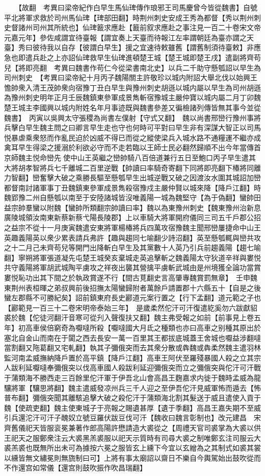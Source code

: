 　　【故翻　考異曰梁帝紀作白早生馬仙琕傳作琅邪王司馬慶曾今皆從魏書】自號平北將軍求救於司州馬仙琕【琕部田翻】時荆州刺史安成王秀為都督【秀以荆州刺史督諸州司州其所統也】仙琕籖求應赴【籖前叙求應赴之事注見一百二十卷宋文帝元嘉元年】參佐咸謂宜待臺報【謂宜奏上天臺而待報江左率謂朝廷為臺亦謂之天臺】秀曰彼待我以自存【彼謂白早生】援之宜速待敕雖舊【謂舊制須待臺敕】非應急也即遣兵赴之上亦詔仙琕救早生仙琕進頓楚王城【楚王城即楚王戌】遣副將齊苟兒【將即亮翻　考異曰魏書作苟仁今從梁書南北史】以兵二千助守懸瓠詔以早生為司州刺史　【考異曰梁帝紀十月丙子魏陽關主許敬珍以城内附詔大舉北伐以始興王憺帥衆入清王茂帥衆向宿豫丁丑白早生與豫州刺史胡遜以城内屬以早生為司州胡遜為豫州刺史明年正月壬辰魏鎮東參軍成景雋斬宿豫城主嚴仲寶以城内屬二月丁卯魏楚王城主李國興以城内附姓名年月事迹既與魏書參差又徧檢諸列傳皆無其事今並從魏書】　丙寅以吳興太守張稷為尚書左僕射【守式又翻】　魏以尚書邢巒行豫州事將兵擊白早生魏主問之曰卿言早生走也守也何時可平對曰早生非有深謀大智正以司馬悦暴虐乘衆怒而作亂民迫於凶威不得已而從之縱使梁兵入城水路不通糧運不繼亦成禽耳早生得梁之援溺於利欲必守而不走若臨以王師士民必翻然歸順不出今年當傳首京師魏主悦命巒先使中山王英繼之巒帥騎八百倍道兼行五日至鮑口丙子早生遣其大將胡孝智將兵七千離城二百里逆戰【帥讀曰率騎奇寄翻下同將即亮翻下椿將同離力智翻】巒奮擊大破之乘勝長驅至懸瓠早生出城逆戰又破之因渡汝水圍其城詔加巒都督南討諸軍事丁丑魏鎮東參軍成景雋殺宿豫戍主嚴仲賢以城來降【降戶江翻】時魏郢豫二州自懸瓠以南至于安陸諸城皆沒唯義陽一城為魏堅守【為于偽翻】蠻帥田益宗帥羣蠻以附魏【蠻帥所類翻宗帥讀曰率】魏以為東豫州刺史【魏東豫州治新息廣陵城領汝南東新蔡新蔡弋陽長陵郡】上以車騎大將軍開府儀同三司五千戶郡公招之益宗不從十一月庚寅魏遣安東將軍楊椿將兵四萬攻宿豫魏主聞邢巒屢捷命中山王英趣義陽英以衆少累表請兵弗許【趣與趨同七喻翻少詩沼翻】英至懸瓠輒與巒共攻之十二月己未齊苟兒等開門出降斬白早生及其黨數十人英乃引兵前趨義陽【趨七喻翻】寧朔將軍張道凝先屯楚王城癸亥棄城走英追擊斬之魏義陽太守狄道辛祥與婁悦共守義陽將軍胡武城陶平虜攻之祥夜出襲其營擒平虜斬武城由是州境獲全論功當賞婁悦恥功出其下間之於執政賞遂不行【間古莧翻史言高肇專魏賞罰無章】　壬申魏東荆州表桓暉之弟叔興前後招撫太陽蠻歸附者萬餘戶請置郡十六縣五十【自是之後蠻左郡縣不可勝紀矣】詔前鎮東府長史酈道元案行置之【行下孟翻】道元範之子也【酈範見一百三十二卷宋明帝泰始三年】　是歲柔然佗汗可汗復遣紇奚勿六跋獻貂裘於魏【佗徒河翻汗音寒可從刋入聲復扶又翻】魏主弗受報之如前【前事見上卷五年】初高車侯倍窮奇為嚈噠所殺【嚈噠國大月氐之種類也亦曰高車之别種其原出於塞北自金山而南在于闐之西去長安一萬一百里其王都拔底城蓋王舍城也嚈益涉翻噠當割翻又陁葛翻又宅軋翻】執其子彌俄突而去其衆分散或犇魏或犇柔然魏主遣羽林監河南孟威撫納降戶置於高平鎮【降戶江翻】高車王阿伏至羅殘暴國人殺之立其宗人跋利延嚈噠奉彌俄突以伐高車國人殺跋利延迎彌俄突而立之彌俄突與佗汗可汗戰于蒲類海不勝西走三百餘里佗汗軍于伊吾北山會高昌王麴嘉求内徙于魏時孟威為龍驤將軍【驤思將翻】魏主遣威發凉州兵三千人迎之至伊吾佗汗見威軍怖而遁去【怖普布翻】彌俄突聞其離駭追擊大破之殺佗汗于蒲類海北割其髮送于威且遣使入貢于魏【使疏吏翻】魏主使東城子于亮報之賜遺甚厚【遺于季翻】高昌王嘉失期不至威引兵還沱汗可汗子醜奴立號豆羅伏跋豆伐可汗【魏收曰魏言彰制也】改元建昌　宋齊舊儀祀天皆服衮冕兼著作郎高陽許懋請造大裘從之【周禮天官司裘掌為大裘以供王祀天之服鄭衆注云大裘黑羔裘服以祀天示質時有司尋大裘之制唯鄭玄注司服云大裘羔裘也既無所出未可為據按六冕之服皆玄上纁下今宜以玄繒為之其制式如裘其裳以纁皆無文繡冕則無旒制曰可】上將有事太廟詔以齋日不樂自今輿駕始出鼓吹從而不作還宫如常儀【還宫則鼓吹振作吹昌瑞翻】

